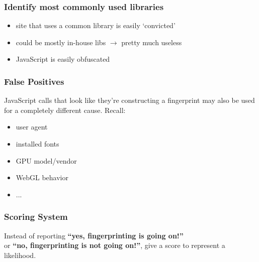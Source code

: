 \documentclass{beamer}
\begin{document}
\begin{frame}
    \frametitle{Identify most commonly used libraries}
    \begin{itemize}
        \item site that uses a common library is easily `convicted'
        \item could be mostly in-house libs $\rightarrow$ pretty much useless
        \item JavaScript is easily obfuscated
    \end{itemize}
    
\end{frame}


\begin{frame}
    \frametitle{False Positives}
    JavaScript calls that look like they're constructing a fingerprint may also be
    used for a completely different cause. Recall:
    \begin{itemize}
        \item user agent
        \item installed fonts
        \item GPU model/vendor
        \item WebGL behavior
        \item ...
    \end{itemize}
\end{frame}


\begin{frame}
    \frametitle{Scoring System}
    Instead of reporting \textbf{``yes, fingerprinting is going on!''} \\
    or \textbf{``no, fingerprinting is not going on!''}, give a score
    to represent a likelihood.
\end{frame}

\end{document}
